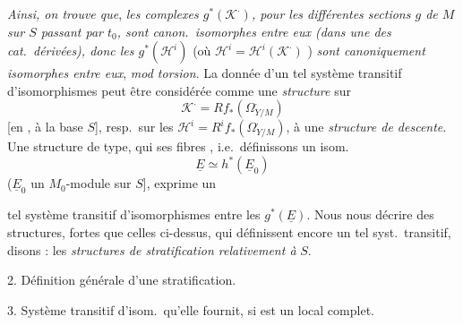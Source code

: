 \documentclass[11pt,a4paper]{article}
\begin{document}



\emph{Ainsi, on trouve que},  \emph{les
complexes $g^{*}(\mathcal{K}^{\cdot})$, pour les différentes sections $g$
de $M$ sur $S$ passant par $t_0$, sont canon.\ isomorphes entre eux (dans
une des cat.\ dérivées), donc les $g^{*}(\mathcal{H}^{i})$}
(où $\mathcal{H}^{i} = \mathcal{H}^{i}(\mathcal{K}^{\cdot})$
) \emph{sont canoniquement isomorphes entre
eux},  \emph{mod torsion}. La donnée d'un tel système transitif
d'isomorphismes \struck{\ill{}} peut être considérée comme une
\emph{structure} \ill{} sur
\[
  \mathcal{K}^{\cdot} = Rf_{*}(\Omega^{\cdot}_{Y/M})
\]
[en \ill{} , à la base $S$], resp.\ sur les
$\mathcal{H}^{i} = R^{i}f_{*}(\Omega^{\cdot}_{Y/M})$,
 
\add{\ill{} \ill{}} à une \emph{structure de descente}. Une structure de
\struck{\ill{}} \ill{} \ill{}  type, \ill{} \ill{} \ill{} qui \ill{} ses
fibres \ill{}, i.e.\ définissons un isom.
\[
  \underline{E} \simeq h^{*}(\underline{E}_0)
\]
($\underline{E}_0$ un $M_0$-module \ill{} sur $S$], exprime un


tel système transitif d'isomorphismes entre les $g^{*}(\underline{E})$.
Nous nous \ill{} décrire des structures,  fortes que
celles ci-dessus, qui définissent encore un tel syst.\ transitif,
disons : les \emph{structures de stratification relativement à} $S$.

2. Définition générale d'une stratification. 

3. Système transitif d'isom.\ qu'elle fournit, si \ill{} est un \ill{}
\ill{} local complet.
\end{document}
